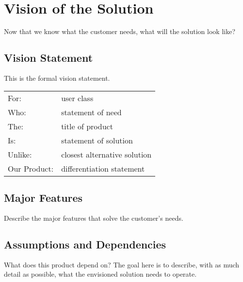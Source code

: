 \section{Vision of the Solution}
Now that we know what the customer needs, 
what will the solution look like? 
\subsection{Vision Statement}
 This is the formal vision statement.  
 \begin{tabular}{ll}
 For:         &user class\\
 Who:         &statement of need\\
 The:         &title of product\\
 Is:          &statement of solution\\
 Unlike:      &closest alternative solution\\
 Our Product: &differentiation statement  \\
 \end{tabular}  
\subsection{Major Features}
 Describe the major features that solve the customer's needs.

\subsection{Assumptions and Dependencies}
 What does this product depend on?  
 The goal here is to describe, with as much detail as possible, what the envisioned
 solution needs to operate.  


